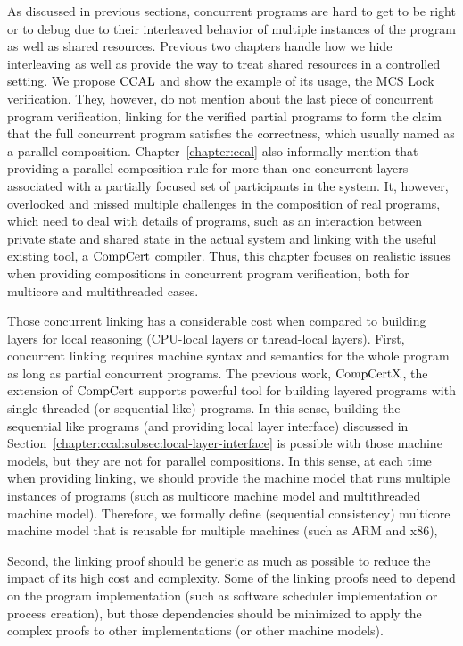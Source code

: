 As discussed in previous sections,  concurrent programs are hard to get to be right or to debug due to their interleaved behavior of multiple instances of the program as well as shared resources. 
Previous two chapters handle how we hide interleaving as well as provide the way to treat shared resources in a controlled setting. 
We propose  $\mathrm{CCAL}$ and show the example of its usage, the MCS Lock verification.
They, however, do not mention about the last piece of concurrent program verification, 
linking for the verified partial programs to form the claim that the full concurrent program satisfies the correctness, 
which usually named as a parallel composition. 
Chapter~\ref{chapter:ccal} also informally mention that providing a  parallel composition rule for more than one
concurrent layers associated with a partially focused set of participants in the system. 
It, however, overlooked and missed multiple challenges in the composition of real programs,
which need to deal with details of programs, 
such as an interaction between private state and shared state in the actual system and linking with the useful existing tool, a $\mathrm{CompCert}$ compiler. 
Thus, this chapter focuses on realistic issues when providing compositions in concurrent program verification,
both for multicore and multithreaded cases.

Those concurrent linking has a considerable cost when compared to building layers for local reasoning (CPU-local layers or thread-local layers).
First,  concurrent linking requires machine syntax and semantics 
for the whole program as long as partial concurrent programs.
The previous work, $\mathrm{CompCertX}$, the extension of $\mathrm{CompCert}$
supports powerful tool for building layered programs with single threaded (or sequential like) programs.
In this sense, 
building the sequential like programs (and providing local layer interface) discussed in Section~\ref{chapter:ccal:subsec:local-layer-interface} 
is possible with those machine models,
but they are not for parallel compositions. 
In this sense, at each time when providing linking, 
we should provide the machine model that runs multiple instances of programs
(such as multicore machine model and multithreaded machine model). 
Therefore, we  formally define (sequential consistency) multicore machine model that is reusable for multiple 
machines (such as ARM and x86), 

Second,  
the linking proof should be generic as much as possible to reduce the impact of its high cost and complexity. 
Some of the linking proofs need to depend
on the program implementation (such as software scheduler implementation or process creation), 
but those dependencies should be minimized to apply the complex proofs to other implementations (or other machine models). 

